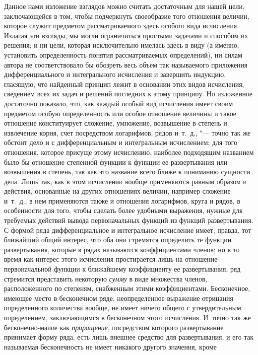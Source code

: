 Данное нами изложение взглядов можно считать достаточным для нашей цели,
заключающейся в том, чтобы подчеркнуть своеобразие того отношения величин,
которое служит предметом рассматриваемого здесь особого вида исчисления.
Излагая эти взгляды, мы могли ограничиться простыми задачами и способом их
решения; и ни цели, которая исключительно имелась здесь в виду (а именно:
установить определенность понятия рассматриваемых определений), ни силам
автора не соответствовало бы обозреть весь объем так называемого приложения
дифференциального и интегрального исчисления и завершить индукцию, гласящую,
что найденный принцип лежит в основании этих видов исчисления, сведением
всех их задач и решений последних к этому принципу. Но изложенное
достаточно показало, что, как каждый особый вид исчисления имеет своим
предметом особую определенность или особое отношение величины и такое
отношение конституирует сложение, умножение, возвышение в степень и
извлечение корня, счет посредством логарифмов, рядов и~т.~д., "--- точно так
же обстоит дело и с дифференциальным и интегральным исчислением; для того
отношения, которое присуще этому исчислению, наиболее подходящим названием
было бы отношение степенн\'{о}й функции к функции ее развертывания или
возвышения в степень, так как это название всего ближе к пониманию сущности
дела. Лишь так, как в этом исчислении вообще применяются равным образом и
действия, основанные на других отношениях величин, например сложение
и~т.~д., в нем применяются также и отношения логарифмов, круга и рядов, в
особенности для того, чтобы сделать более удобными выражения, нужные для
требуемых действий вывода первоначальных функций из функций развертывания.
С формой ряда дифференциальное и интегральное исчисление имеет, правда, тот
ближайший общий интерес, что оба они стремятся определить те функции
развертывания, которые в рядах называются коэффициентами членов; но в то
время как интерес этого исчисления простирается лишь на отношение
первоначальной функции к ближайшему коэффициенту ее развертывания, ряд
стремится представить некоторую {\em сумму} в виде
множества членов, расположенного по степеням, снабженным этими
коэффициентами. Бесконечное, имеющее место в бесконечном ряде,
неопределенное выражение отрицания определенного количества вообще, не
имеет ничего общего с утвердительным определением, заключающимся в
бесконечном этого исчисления. И~точно так же бесконечно-малое как
{\em приращение}, посредством которого развертывание
принимает форму ряда, есть лишь внешнее средство для развертывания, и его
так называемая бесконечность не имеет никакого другого значения, кроме
